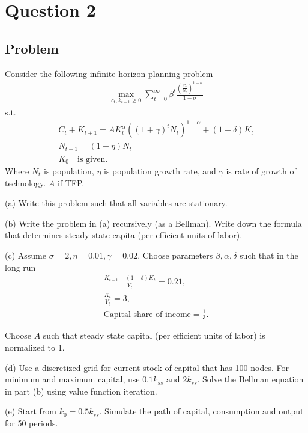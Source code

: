 \documentclass[10pt, a4paper]{article}
\begin{document}
\section*{Question 2}
  \subsection*{Problem}
    Consider the following infinite horizon planning problem
    \begin{align*}
      \max_{c_t, k_{t+1} \geq 0} \sum_{t=0}^{\infty} \beta^t \frac{\left( \frac{C_t}{N_t} \right)^{1-\sigma}}{1 - \sigma}
    \end{align*}
    s.t.
    \begin{align*}
      C_t + K_{t+1} = A K_t^\alpha \left( (1 + \gamma)^t N_t \right)^{1 - \alpha} + (1 - \delta) K_t \\
      N_{t+1} = (1 + \eta) N_t \\
      K_0 \quad \text{is given.}
    \end{align*}
    Where $N_t$ is population, $\eta$ is population growth rate, and $\gamma$ is rate of growth of technology. $A$ if TFP.

    (a) Write this problem such that all variables are stationary.

    (b) Write the problem in (a) recursively (as a Bellman). Write down the formula that determines steady state capita (per efficient units of labor).

    (c) Assume $\sigma = 2, \eta = 0.01, \gamma=0.02$. Choose parameters $\beta, \alpha, \delta$ such that in the long run
    \begin{align*}
      \frac{K_{t+1}-(1-\delta)K_t}{Y_t} = 0.21, \\
      \frac{K_t}{Y_t} = 3, \\
      \text{Capital share of income} = \frac{1}{3}.
    \end{align*}

    Choose $A$ such that steady state capital (per efficient units of labor) is normalized to 1.

    (d) Use a discretized grid for current stock of capital that has 100 nodes. For minimum and maximum capital, use $0.1k_{ss}$ and $2k_{ss}$. Solve the Bellman equation in part (b) using value function iteration.

    (e) Start from $k_0=0.5k_{ss}$. Simulate the path of capital, consumption and output for 50 periods.
\end{document}

